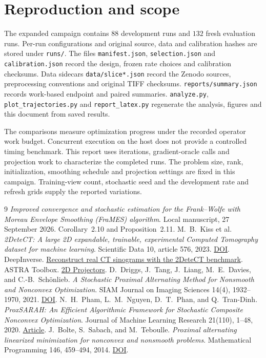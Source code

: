 \documentclass[11pt]{article}
\begin{document}
\section{Reproduction and scope}
The expanded campaign contains \(88\) development runs and \(132\) fresh
evaluation runs. Per-run configurations and original source, data and
calibration hashes are stored under \texttt{runs/}. The files
\texttt{manifest.json}, \texttt{selection.json} and
\texttt{calibration.json} record the design, frozen rate choices and
calibration checksums. Data sidecars \texttt{data/slice*.json} record the
Zenodo sources, preprocessing conventions and original TIFF checksums.
\texttt{reports/summary.json} records work-based endpoint and paired
summaries. \texttt{analyze.py}, \texttt{plot\_trajectories.py} and
\texttt{report\_latex.py} regenerate the analysis, figures and this document
from saved results.

The comparisons measure optimization progress under the recorded operator
work budget. Concurrent execution on the host does not provide a controlled
timing benchmark. This report uses iterations, gradient-oracle calls and
projection work to characterize the completed runs. The problem size, rank,
initialization, smoothing schedule and projection settings are fixed in this
campaign. Training-view count, stochastic seed and the development rate and
refresh grids supply the reported variations.

\begin{thebibliography}{9}
\emph{Improved convergence and stochastic estimation for the Frank--Wolfe
with Moreau Envelope Smoothing (FraMES) algorithm}. Local manuscript,
27 September 2026. Corollary~2.10 and Proposition~2.11.
M.~B.~Kiss et al.
\emph{2DeteCT: A large 2D expandable, trainable, experimental Computed Tomography
dataset for machine learning}. Scientific Data 10, article 576, 2023.
\href{https://doi.org/10.1038/s41597-023-02484-6}{DOI}.
DeepInverse.
\href{https://deepinv.org/auto_examples/external-libraries/demo_astra_2detect.html}
{Reconstruct real CT sinograms with the 2DeteCT benchmark}.
ASTRA Toolbox. \href{https://astra-toolbox.com/docs/proj2d.html#fan-beam}{2D Projectors}.
D.~Driggs, J.~Tang, J.~Liang, M.~E.~Davies, and C.-B.~Sch\"onlieb.
\emph{A Stochastic Proximal Alternating Method for Nonsmooth and Nonconvex Optimization}.
SIAM Journal on Imaging Sciences 14(4), 1932--1970, 2021.
\href{https://doi.org/10.1137/20M1387213}{DOI}.
N.~H.~Pham, L.~M.~Nguyen, D.~T.~Phan, and Q.~Tran-Dinh.
\emph{ProxSARAH: An Efficient Algorithmic Framework for Stochastic Composite Nonconvex Optimization}.
Journal of Machine Learning Research 21(110), 1--48, 2020.
\href{https://www.jmlr.org/papers/v21/19-248.html}{Article}.
J.~Bolte, S.~Sabach, and M.~Teboulle.
\emph{Proximal alternating linearized minimization for nonconvex and nonsmooth problems}.
Mathematical Programming 146, 459--494, 2014.
\href{https://doi.org/10.1007/s10107-013-0701-9}{DOI}.
\end{thebibliography}
\end{document}
